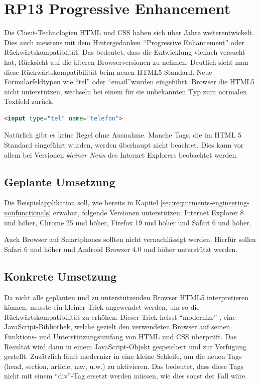 \section{RP13 Progressive Enhancement}
\label{sec:principle-rp13-progressive-enhancement}

Die Client-Technologien HTML und CSS haben sich über Jahre weiterentwickelt. Dies auch meistens mit dem Hintergedanken ``Progressive Enhancement'' oder Rückwärtskompatiblität. Das bedeutet, dass die Entwicklung vielfach versucht hat, Rücksicht auf die älteren Browserversionen zu nehmen.
Deutlich sieht man diese Rückwärtskompatibilität beim neuen HTML5 Standard. Neue Formularfeldtypen wie ``tel'' oder ``email''wurden eingeführt. Browser die HTML5 nicht unterstützen, wechseln bei einem für sie unbekannten Typ zum normalen Textfeld zurück.

\begin{lstlisting}[language=HTML, caption={Formularfeld mit HTML5, welches eine Telefonnummer erwartet}, label={lst:html5TelInput}]
<input type="tel" name="telefon">
\end{lstlisting}

Natürlich gibt es keine Regel ohne Ausnahme. Manche Tags, die im HTML 5 Standard eingeführt wurden, werden überhaupt nicht beachtet. Dies kann vor allem bei Versionen \emph{kleiner Neun} des Internet Explorers beobachtet werden.

\subsection*{Geplante Umsetzung}
Die Beispielapplikation soll, wie bereits in Kapitel \ref{sec:requirments-engineering-nonfunctionals} erwähnt, folgende Versionen unterstützen: Internet Explorer 8 und höher, Chrome 25 und höher, Firefox 19 und höher und Safari 6 und höher.

Auch Browser auf Smartphones sollten nicht vernachlässigt werden. Hierfür sollen Safari 6 und höher und Android Browser 4.0 und höher unterstützt werden.

\subsection*{Konkrete Umsetzung}
Da nicht alle geplanten und zu unterstützenden Browser HTML5 interpretieren können, musste ein kleiner Trick angewendet werden, um so die Rückwärtskompatibilität zu erhöhen. Dieser Trick heisst ``modernizr'' \cite{modernizr}, eine JavaScript-Bibliothek, welche gezielt den verwendeten Browser auf seinen Funktions- und Unterstützungsumfang von HTML und CSS überprüft. Das Resultat wird dann in einem JavaScript-Objekt gespeichert und zur Verfügung gestellt.  Zusätzlich läuft modernizr in eine kleine Schleife, um die neuen Tags (head, section, article, nav, u.w.) zu aktivieren. Das bedeutet, dass diese Tags nicht mit einem ``div''-Tag ersetzt werden müssen, wie dies sonst der Fall wäre.

